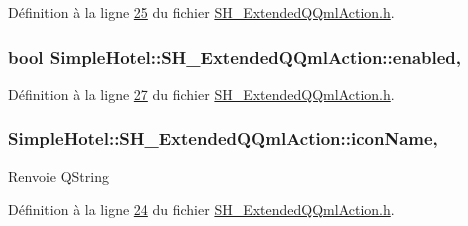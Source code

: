 Définition à la ligne \hyperlink{SH__ExtendedQQmlAction_8h_source_l00025}{25} du fichier \hyperlink{SH__ExtendedQQmlAction_8h_source}{S\-H\-\_\-\-Extended\-Q\-Qml\-Action.\-h}.

\hypertarget{classSimpleHotel_1_1SH__ExtendedQQmlAction_a5ca7a74896fdee942f716e07d8421b6a}{
\subsubsection[{enabled}]{\setlength{\rightskip}{0pt plus 5cm}bool Simple\-Hotel\-::\-S\-H\-\_\-\-Extended\-Q\-Qml\-Action\-::enabled\hspace{0.3cm}{\ttfamily [read]}, {\ttfamily [write]}}}\label{classSimpleHotel_1_1SH__ExtendedQQmlAction_a5ca7a74896fdee942f716e07d8421b6a}


Définition à la ligne \hyperlink{SH__ExtendedQQmlAction_8h_source_l00027}{27} du fichier \hyperlink{SH__ExtendedQQmlAction_8h_source}{S\-H\-\_\-\-Extended\-Q\-Qml\-Action.\-h}.

\hypertarget{classSimpleHotel_1_1SH__ExtendedQQmlAction_ad87f9f88cf3b5fbad2ab49c71bfe2a1b}{
\subsubsection[{icon\-Name}]{\setlength{\rightskip}{0pt plus 5cm}Simple\-Hotel\-::\-S\-H\-\_\-\-Extended\-Q\-Qml\-Action\-::icon\-Name\hspace{0.3cm}{\ttfamily [read]}, {\ttfamily [write]}}}\label{classSimpleHotel_1_1SH__ExtendedQQmlAction_ad87f9f88cf3b5fbad2ab49c71bfe2a1b}
\begin{DoxyReturn}{Renvoie}
Q\-String 
\end{DoxyReturn}


Définition à la ligne \hyperlink{SH__ExtendedQQmlAction_8h_source_l00024}{24} du fichier \hyperlink{SH__ExtendedQQmlAction_8h_source}{S\-H\-\_\-\-Extended\-Q\-Qml\-Action.\-h}.


